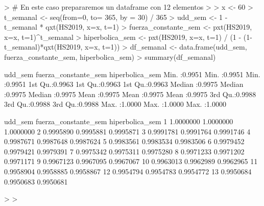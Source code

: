 \documentclass[12pt]{report}
\begin{document}
\begin{Schunk}
\begin{Sinput}
> # En este caso prepararemos un dataframe con 12 elementos 
> 
> x <- 60
> t_semanal <- seq(from=0, to= 365, by = 30) / 365
> udd_sem <- 1 - t_semanal * qxt(HS2019, x=x, t=1)
> fuerza_constante_sem <- pxt(HS2019, x=x, t=1)^t_semanal
> hiperbolica_sem <-  pxt(HS2019, x=x, t=1) / (1 - (1-t_semanal)*qxt(HS2019, x=x, t=1))
> df_semanal <- data.frame(udd_sem, fuerza_constante_sem, hiperbolica_sem)
> summary(df_semanal)
\end{Sinput}
\begin{Soutput}
    udd_sem       fuerza_constante_sem hiperbolica_sem 
 Min.   :0.9951   Min.   :0.9951       Min.   :0.9951  
 1st Qu.:0.9963   1st Qu.:0.9963       1st Qu.:0.9963  
 Median :0.9975   Median :0.9975       Median :0.9975  
 Mean   :0.9975   Mean   :0.9975       Mean   :0.9975  
 3rd Qu.:0.9988   3rd Qu.:0.9988       3rd Qu.:0.9988  
 Max.   :1.0000   Max.   :1.0000       Max.   :1.0000  
\end{Soutput}
\begin{Soutput}
     udd_sem fuerza_constante_sem hiperbolica_sem
1  1.0000000            1.0000000       1.0000000
2  0.9995890            0.9995881       0.9995871
3  0.9991781            0.9991764       0.9991746
4  0.9987671            0.9987648       0.9987624
5  0.9983561            0.9983534       0.9983506
6  0.9979452            0.9979421       0.9979391
7  0.9975342            0.9975311       0.9975280
8  0.9971233            0.9971202       0.9971171
9  0.9967123            0.9967095       0.9967067
10 0.9963013            0.9962989       0.9962965
11 0.9958904            0.9958885       0.9958867
12 0.9954794            0.9954783       0.9954772
13 0.9950684            0.9950683       0.9950681
\end{Soutput}
\begin{Sinput}
> 
> 
\end{Sinput}
\end{Schunk}
\end{document}
